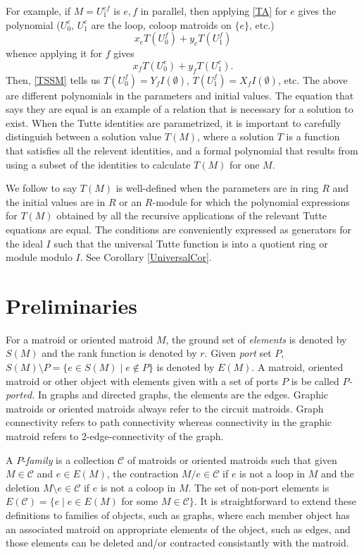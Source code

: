 \documentclass[12pt,leqno]{amsart}
\theoremstyle{remark}
\begin{document}
For example, if $M=U_{1}^{ef}$ is  ${e,f}$ in parallel, then
applying \eqref{TA} for $e$ gives the polynomial
($U^e_0$, $U^e_1$ are the loop, coloop matroids on $\{e\}$, etc.)
\[x_e T(U_0^f) + y_e T(U_1^f)\]
 whence applying it for $f$ gives 
\[x_f T(U_0^e) + y_f T(U_1^e).\]  
Then, \eqref{TSSM} tells us $T(U_0^f)=Y_fI(\emptyset)$, 
$T(U_1^f)=X_fI(\emptyset)$, etc.
The above are different polynomials in the parameters and initial values.  
The equation that says they are equal is an example of a relation that 
is necessary for a solution to exist.  
When the Tutte identities are 
parametrized, it is important to carefully distinguish 
between a solution value $T(M)$, where a solution $T$ 
is a function  that
satisfies all the relevent identities, and a formal polynomial  that
results from using a subset of the identities to calculate
$T(M)$ for one $M$\cite{MR93a:05047}.  

We follow \cite{BollobasRiordanTuttePolyColored,Ellis-Monaghan-Traldi}
to say $T(M)$ is well-defined when the parameters are in 
ring $R$ and the initial values are in
$R$ or an $R$-module for which the polynomial expressions for $T(M)$ 
obtained by all the recursive applications of the relevant
Tutte equations are equal.
The conditions are conveniently expressed as generators 
for the ideal $I$ such that the universal Tutte function is into
a quotient ring or module modulo $I$.
See Corollary \ref{UniversalCor}.

\section{Preliminaries}

For a matroid or oriented matroid $M$, the
ground set of \emph{elements} is denoted by $S(M)$ and the rank function 
is denoted by $r$.  Given
\emph{port} set $P$, $S(M)\setminus P=\{e\in S(M) \mid e\not\in P\}$ 
is denoted by $E(M)$.  
A matroid, oriented matroid or other object with elements
given with a set of ports $P$ is be called
\emph{$P$-ported.}  In graphs and directed graphs, the elements 
are the edges.  Graphic matroids or oriented matroids always
refer to the circuit matroids.  Graph connectivity refers to
path connectivity whereas connectivity in the graphic matroid
refers to 2-edge-connectivity of the graph.

A $P$-\emph{family} is a collection $\mathcal{C}$ 
of matroids or oriented matroids such that
given $M\in \mathcal{C}$ and $e\in E(M)$, 
the contraction $M/e\in\mathcal{C}$ if $e$ is not a loop in
$M$ and the deletion $M\setminus e\in\mathcal{C}$ if 
$e$ is  not a coloop in $M$.  
The set of non-port elements 
is $E(\mathcal{C})=\{e\mid e\in E(M)$ for some $M\in\mathcal{C}\}$.
It is straightforward to extend these definitions to families of
objects, such as graphs, where each member object has an associated matroid
on appropriate elements of the object, such as edges, and those elements
can be deleted and/or contracted consistantly with the matroid.
\end{document}
